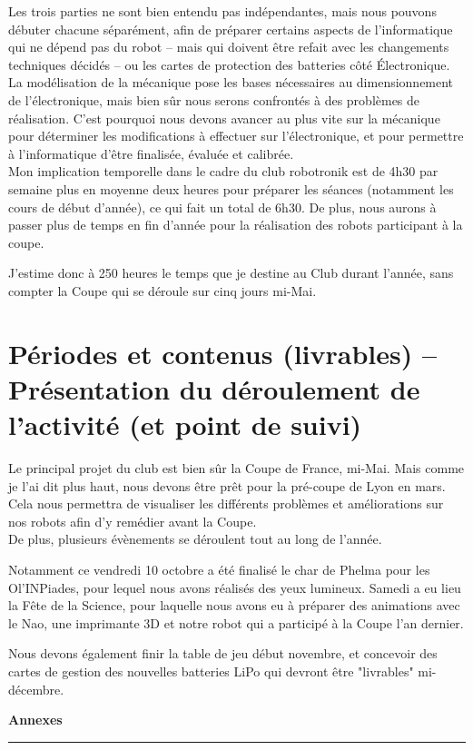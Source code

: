 \documentclass[a4paper,11pt]{article} \usepackage[T1]{fontenc} \usepackage[utf8]{inputenc} \usepackage[francais]{babel}
\begin{document}
Les trois parties ne sont bien entendu pas indépendantes, mais nous pouvons débuter chacune séparément, afin de préparer certains aspects de l'informatique qui ne dépend pas du robot -- mais qui doivent être refait avec les changements techniques décidés -- ou les cartes de protection des batteries côté Électronique.\\

La modélisation de la mécanique pose les bases nécessaires au dimensionnement de l'électronique, mais bien sûr nous serons confrontés à des problèmes de réalisation. C'est pourquoi nous devons avancer au plus vite sur la mécanique pour déterminer les modifications à effectuer sur l'électronique, et pour permettre à l'informatique d'être finalisée, évaluée et calibrée.\\

Mon implication temporelle dans le cadre du club robotronik est de 4h30 par semaine plus en moyenne deux heures pour préparer les séances (notamment les cours de début d'année), ce qui fait un total de 6h30. De plus, nous aurons à passer plus de temps en fin d'année pour la réalisation des robots participant à la coupe.

J'estime donc à 250 heures le temps que je destine au Club durant l'année, sans compter la Coupe qui se déroule sur cinq jours mi-Mai.


\part{Périodes et contenus (livrables) – Présentation du déroulement de l'activité (et point de suivi) }

Le principal projet du club est bien sûr la Coupe de France, mi-Mai. Mais comme je l'ai dit plus haut, nous devons être prêt pour la pré-coupe de Lyon en mars. Cela nous permettra de visualiser les différents problèmes et améliorations sur nos robots afin d'y remédier avant la Coupe.\\

De plus, plusieurs évènements se déroulent tout au long de l'année.

Notamment ce vendredi 10 octobre a été finalisé le char de Phelma pour les Ol'INPiades, pour lequel nous avons réalisés des yeux lumineux. Samedi a eu lieu la Fête de la Science, pour laquelle nous avons eu à préparer des animations avec le Nao, une imprimante 3D et notre robot qui a participé à la Coupe l'an dernier.

Nous devons également finir la table de jeu début novembre, et concevoir  des cartes de gestion des nouvelles batteries LiPo qui devront être "livrables" mi-décembre.\\

\newpage
\begin{center}
\setcounter{page}{0}
\vspace*{10cm}
{\huge\bfseries Annexes\\
[0.4cm]}\rule{\linewidth}{0.5mm}
\end{center}

\newpage

\end{document}
